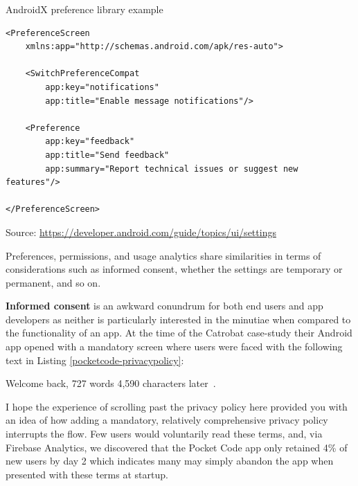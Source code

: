 \begin{listing}[H]
\caption{AndroidX preference library example} \label{code:androidx_preferences_example}
\begin{verbatim}
<PreferenceScreen
    xmlns:app="http://schemas.android.com/apk/res-auto">

    <SwitchPreferenceCompat
        app:key="notifications"
        app:title="Enable message notifications"/>

    <Preference
        app:key="feedback"
        app:title="Send feedback"
        app:summary="Report technical issues or suggest new features"/>

</PreferenceScreen>
\end{verbatim}
Source: \url{https://developer.android.com/guide/topics/ui/settings}
\end{listing}


Preferences, permissions, and usage analytics share similarities in terms of considerations such as informed consent, whether the settings are temporary or permanent, and so on.


\textbf{Informed consent}
is an awkward conundrum for both end users and app developers as neither is particularly interested in the minutiae when compared to the functionality of an app.  
At the time of the Catrobat case-study their Android app opened with a mandatory screen where users were faced with the following text in Listing \ref{pocketcode-privacypolicy}:



Welcome back, 727 words 4,590 characters later~. 

I hope the experience of scrolling past the privacy policy here provided you with an idea of how adding a mandatory, relatively comprehensive privacy policy interrupts the flow. %
Few users would voluntarily read these terms, and, via Firebase Analytics, we discovered that the Pocket Code app only retained 4\% of new users by day 2 which indicates many may simply abandon the app when presented with these terms at startup.  %

